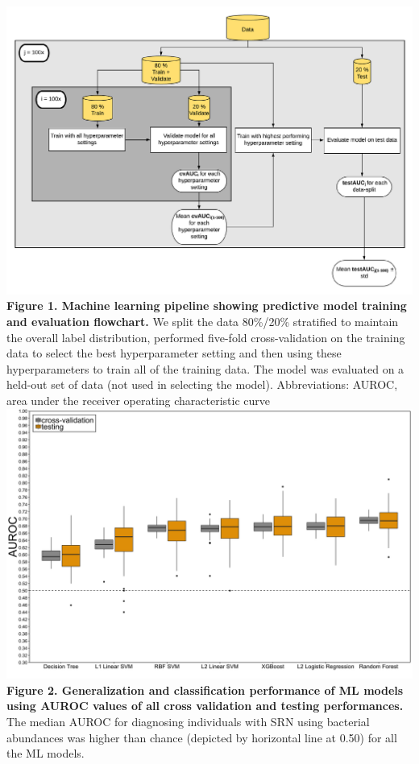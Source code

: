 \documentclass[11pt,]{article}
\begin{document}
\includegraphics{Figure_1} \textbf{Figure 1. Machine learning pipeline
showing predictive model training and evaluation flowchart. } We split
the data 80\%/20\% stratified to maintain the overall label
distribution, performed five-fold cross-validation on the training data
to select the best hyperparameter setting and then using these
hyperparameters to train all of the training data. The model was
evaluated on a held-out set of data (not used in selecting the model).
Abbreviations: AUROC, area under the receiver operating characteristic
curve \newpage
\includegraphics{Figure_2.png} \textbf{Figure 2. Generalization and
classification performance of ML models using AUROC values of all cross
validation and testing performances. } The median AUROC for diagnosing
individuals with SRN using bacterial abundances was higher than chance
(depicted by horizontal line at 0.50) for all the ML models.
\end{document}
